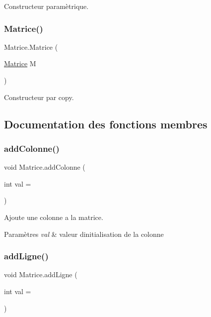Constructeur paramètrique. 

\mbox{\label{class_matrice_a5a09b487960e0274a8caba85cf34397d}} 
\subsubsection{\texorpdfstring{Matrice()}{Matrice()}\hspace{0.1cm}{\footnotesize\ttfamily [3/3]}}
{\footnotesize\ttfamily Matrice.\+Matrice (\begin{DoxyParamCaption}\item[{\hyperlink{class_matrice}{Matrice}}]{M }\end{DoxyParamCaption})}



Constructeur par copy. 



\subsection{Documentation des fonctions membres}
\mbox{\label{class_matrice_a64aff02cb523d7a5db9bb268f2012444}} 
\subsubsection{\texorpdfstring{add\+Colonne()}{addColonne()}}
{\footnotesize\ttfamily void Matrice.\+add\+Colonne (\begin{DoxyParamCaption}\item[{int}]{val = {} }\end{DoxyParamCaption})}



Ajoute une colonne a la matrice. 


\begin{DoxyParams}{Paramètres}
{\em val} & valeur d\textquotesingle{}initialisation de la colonne \\
\hline
\end{DoxyParams}
\mbox{\label{class_matrice_a6c119431b7a8641c5b6ea19bce336036}} 
\subsubsection{\texorpdfstring{add\+Ligne()}{addLigne()}}
{\footnotesize\ttfamily void Matrice.\+add\+Ligne (\begin{DoxyParamCaption}\item[{int}]{val = {} }\end{DoxyParamCaption})}



